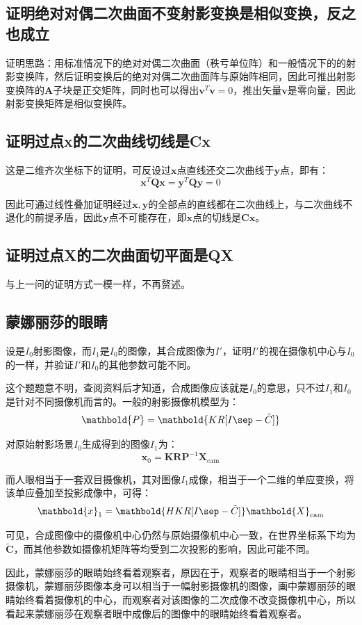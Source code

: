 \documentclass[11pt]{article}
\begin{document}
\subsection{证明绝对对偶二次曲面不变射影变换是相似变换，反之也成立}
证明思路：用标准情况下的绝对对偶二次曲面（秩亏单位阵）和一般情况下的的射影变换阵，然后证明变换后的绝对对偶二次曲面阵与原始阵相同，因此可推出射影变换阵的$\mathbf{A}$子块是正交矩阵，同时也可以得出$\mathbf{v}^T\mathbf{v}=0$，推出矢量$\mathbf{v}$是零向量，因此射影变换矩阵是相似变换阵。
\subsection{证明过点x的二次曲线切线是Cx}
这是二维齐次坐标下的证明，可反设过$\mathbf{x}$点直线还交二次曲线于$\mathbf{y}$点，即有：
\begin{equation*}
  \mathbf{x}^T\mathbf{Qx}=\mathbf{y}^T\mathbf{Qy}=0
\end{equation*}\par
因此可通过线性叠加证明经过$\mathbf{x,y}$的全部点的直线都在二次曲线上，与二次曲线不退化的前提矛盾，因此$\mathbf{y}$点不可能存在，即$\mathbf{x}$点的切线是$\mathbf{Cx}$。
\subsection{证明过点X的二次曲面切平面是QX}
与上一问的证明方式一模一样，不再赘述。
\subsection{蒙娜丽莎的眼睛}
{\heiti 设是$I_0$射影图像，而$I_1$是$I_0$的图像，其合成图像为$I'$，证明$I'$的视在摄像机中心与$I_0$的一样，并验证$I'$和$I_0$的其他参数可能不同。}\par
这个题题意不明，查阅资料\cite{MultipleViewGeometry}后才知道，合成图像应该就是$I_0$的意思，只不过$I_1$和$I_0$是针对不同摄像机而言的。一般的射影摄像机模型为：
\begin{equation*}
  \mathbold{P}=\mathbold{KR[I\sep -\tilde{C}]}
\end{equation*}\par
对原始射影场景$I_0$生成得到的图像$I_1$为：
\begin{equation*}
  \mathbold{x}_0=\mathbold{KRP}^{-1}\mathbold{X}_\mathrm{cam}
\end{equation*}\par
而人眼相当于一套双目摄像机，其对图像$I_1$成像，相当于一个二维的单应变换，将该单应叠加至投影成像中，可得：
\begin{equation*}
  \mathbold{x}_1=\mathbold{HKR[I\sep -\tilde{C}]}\mathbold{X}_\mathrm{cam}
\end{equation*}\par
可见，合成图像中的摄像机中心仍然与原始摄像机中心一致，在世界坐标系下均为$\tilde{\mathbf{C}}$，而其他参数如摄像机矩阵等均受到二次投影的影响，因此可能不同。\par
因此，蒙娜丽莎的眼睛始终看着观察者，原因在于，观察者的眼睛相当于一个射影摄像机，蒙娜丽莎图像本身可以相当于一幅射影摄像机的图像，画中蒙娜丽莎的眼睛始终看着摄像机的中心，而观察者对该图像的二次成像不改变摄像机中心，所以看起来蒙娜丽莎在观察者眼中成像后的图像中的眼睛始终看着观察者。
\end{document}
